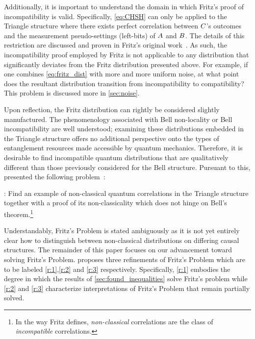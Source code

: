 \documentclass[aps, 10pt, english, twoside, pra, nofootinbib, tightenlines, longbibliography, superscriptaddress]{revtex4-1}
\begin{document}
    Additionally, it is important to understand the domain in which Fritz's proof of incompatibility is valid. Specifically, \cref{eq:CHSH} can only be applied to the Triangle structure where there exists perfect correlation between $C$'s outcomes and the measurement pseudo-settings (left-bits) of $A$ and $B$. The details of this restriction are discussed and proven in Fritz's original work~\cite{Fritz_2012}. As such, the incompatibility proof employed by Fritz is not applicable to any distribution that significantly deviates from the Fritz distribution presented above. For example, if one combines \cref{eq:fritz_dist} with more and more uniform noise, at what point does the resultant distribution transition from incompatibility to compatibility? This problem is discussed more in \cref{sec:noise}.

    Upon reflection, the Fritz distribution can rightly be considered slightly manufactured. The phenomenology associated with Bell non-locality or Bell incompatibility are well understood; examining these distributions embedded in the Triangle structure offers no additional perspective onto the types of entanglement resources made accessible by quantum mechanics. Therefore, it is desirable to find incompatible quantum distributions that are qualitatively different than those previously considered for the Bell structure. Pursuant to this, \citet{Fritz_2012} presented the following problem~\cite[Problem 2.17]{Fritz_2012}:%

    : Find an example of non-classical quantum correlations in the Triangle structure together with a proof of its non-classicality which does not hinge on Bell’s theorem.\footnote{In the way Fritz defines, \textit{non-classical} correlations are the class of \textit{incompatible} correlations.}

    Understandably, Fritz's Problem is stated ambiguously as it is not yet entirely clear how to distinguish between non-classical distributions on differing causal structures. The remainder of this paper focuses on our advancement toward solving Fritz's Problem.  proposes three refinements of Fritz's Problem which are to be labeled \ref{r:1},\ref{r:2} and \ref{r:3} respectively. Specifically, \ref{r:1} embodies the degree in which the results of \cref{sec:found_inequalities} solve Fritz's problem while \ref{r:2} and \ref{r:3} characterize interpretations of Fritz's Problem that remain partially solved.
\end{document}

